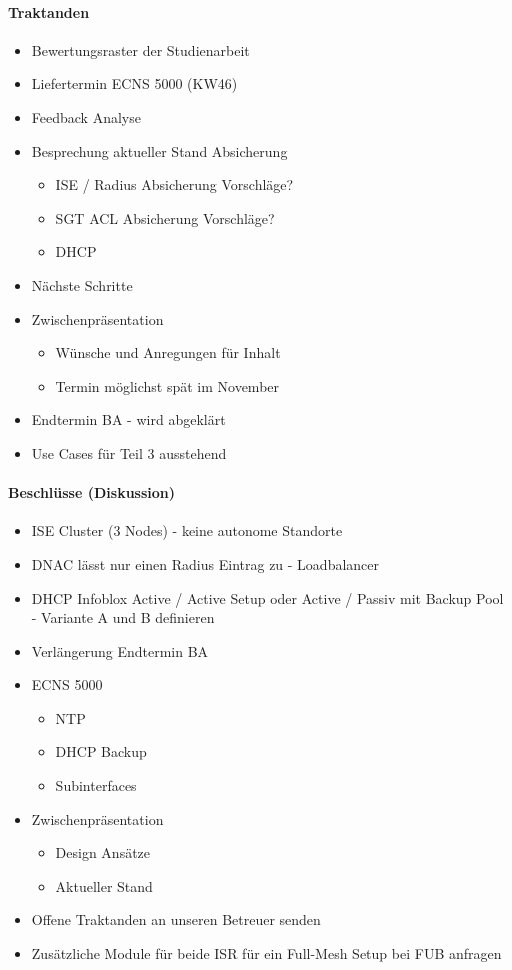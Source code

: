 \paragraph{Traktanden}
\begin{itemize}	
	\item Bewertungsraster der Studienarbeit
	\item Liefertermin ECNS 5000 (KW46)
	\item Feedback Analyse
	\item Besprechung aktueller Stand Absicherung
	\begin{itemize}
		\item ISE / Radius Absicherung Vorschläge?
		\item SGT ACL Absicherung Vorschläge?
		\item DHCP
	\end{itemize}
	\item Nächste Schritte
	\item Zwischenpräsentation 
	\begin{itemize}
		\item Wünsche und Anregungen für Inhalt
		\item Termin möglichst spät im November
	\end{itemize}
	\item Endtermin BA - wird abgeklärt
	\item Use Cases für Teil 3 ausstehend
\end{itemize}

\paragraph{Beschlüsse (Diskussion)}
\begin{itemize}	
	\item ISE Cluster (3 Nodes) - keine autonome Standorte
	\item DNAC lässt nur einen Radius Eintrag zu - Loadbalancer
	\item DHCP Infoblox Active / Active Setup oder Active / Passiv mit Backup Pool - Variante A und B definieren
	\item Verlängerung Endtermin BA
	\item ECNS 5000
	\begin{itemize}
		\item NTP
		\item DHCP Backup
		\item Subinterfaces
	\end{itemize}
	\item Zwischenpräsentation
	\begin{itemize}
		\item Design Ansätze
		\item Aktueller Stand
	\end{itemize}
	\item Offene Traktanden an unseren Betreuer senden
	\item Zusätzliche Module für beide ISR für ein Full-Mesh Setup bei FUB anfragen
\end{itemize}

